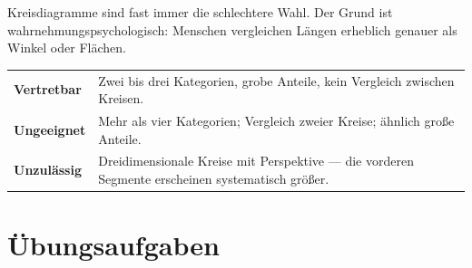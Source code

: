 \begin{warnung}
Kreisdiagramme sind fast immer die schlechtere Wahl. Der Grund ist wahrnehmungspsychologisch: Menschen vergleichen Längen erheblich genauer als Winkel oder Flächen.

\begin{center}
\renewcommand{\arraystretch}{1.5}
\begin{tabular}{@{}P{2.8cm}P{5.8cm}@{}}
\toprule
\textbf{Vertretbar} & Zwei bis drei Kategorien, grobe Anteile, kein Vergleich zwischen Kreisen.\\
\textbf{Ungeeignet} & Mehr als vier Kategorien; Vergleich zweier Kreise; ähnlich große Anteile.\\
\textbf{Unzulässig} & Dreidimensionale Kreise mit Perspektive --- die vorderen Segmente erscheinen systematisch größer.\\
\bottomrule
\end{tabular}
\end{center}

\begin{center}
\begin{minipage}{0.88\textwidth}
\end{minipage}
\end{center}
\end{warnung}

\section{Übungsaufgaben}

